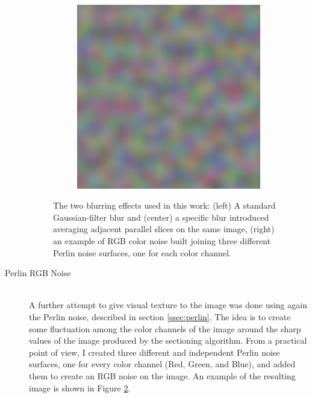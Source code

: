 \documentclass[12pt,a4paper]{report}
\begin{document}
\begin{description}
\begin{figure}
\begin{subfigure}[t]{0.3\textwidth}
                 \caption{}
                 \label{fig:av_blur}
            \end{subfigure}
            \quad
            \begin{subfigure}[t]{0.3\textwidth}
                 \centering
                 \includegraphics[width = \textwidth]{images/rgb_prlin}
                 \caption{}
                 \label{fig:rgb_prlin}
            \end{subfigure}

            \caption{The two blurring effects used in this work: (left) A standard Gaussian-filter blur and (center) a specific blur introduced averaging adjacent parallel slices on the same image, (right) an example of RGB color noise built joining three different Perlin noise surfaces, one for each color channel.}
            \label{fig:blur_effect}
        \end{figure}

        \item [Perlin RGB Noise] \hfill \\
        A further attempt to give visual texture to the image was done using again the Perlin noise, described in section \ref{ssec:perlin}. The idea is to create some fluctuation among the color channels of the image around the sharp values of the image produced by the sectioning algorithm.
        From a practical point of view, I created three different and independent Perlin noise surfaces, one for every color channel (Red, Green, and Blue), and added them to create an RGB noise on the image. An example of the resulting image is shown in Figure \ref{fig:rgb_prlin}.


\end{description}
\end{document}
